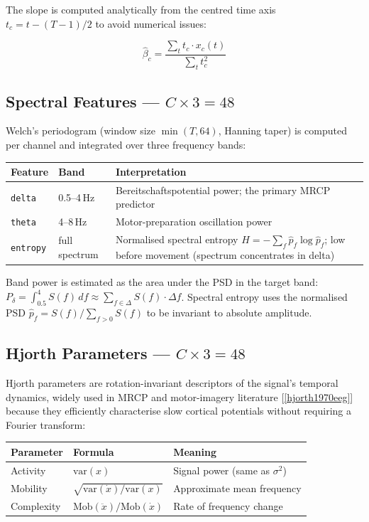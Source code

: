 \documentclass[12pt,a4paper]{article}
\begin{document}
The slope is computed analytically from the centred time axis
$t_c = t - (T-1)/2$ to avoid numerical issues:

\[
  \hat{\beta}_c = \frac{\sum_t t_c \cdot x_c(t)}{\sum_t t_c^2}
\]

\subsection{Spectral Features — $C \times 3 = 48$}

Welch's periodogram (window size $\min(T, 64)$, Hanning taper) is computed
per channel and integrated over three frequency bands:

\begin{center}
\begin{tabular}{llp{7.5cm}}
\toprule
Feature & Band & Interpretation \\
\midrule
\texttt{delta} & 0.5--4\,Hz & Bereitschaftspotential power; the primary MRCP predictor \\
\texttt{theta} & 4--8\,Hz & Motor-preparation oscillation power \\
\texttt{entropy} & full spectrum & Normalised spectral entropy $H = -\sum_f \hat{p}_f \log \hat{p}_f$; low before movement (spectrum concentrates in delta) \\
\bottomrule
\end{tabular}
\end{center}

Band power is estimated as the area under the PSD in the target band:
$P_\delta = \int_{0.5}^{4} S(f)\,df \approx \sum_{f \in \Delta} S(f) \cdot \Delta f$.
Spectral entropy uses the normalised PSD $\hat{p}_f = S(f) / \sum_{f>0} S(f)$
to be invariant to absolute amplitude.

\subsection{Hjorth Parameters — $C \times 3 = 48$}
\label{sec:hjorth}

Hjorth parameters are rotation-invariant descriptors of the signal's
temporal dynamics, widely used in MRCP and motor-imagery literature
[\ref{hjorth1970eeg}] because they efficiently characterise slow cortical
potentials without requiring a Fourier transform:

\begin{center}
\begin{tabular}{lll}
\toprule
Parameter & Formula & Meaning \\
\midrule
Activity & $\text{var}(x)$ & Signal power (same as $\sigma^2$) \\
Mobility & $\sqrt{\text{var}(\dot{x}) / \text{var}(x)}$ & Approximate mean frequency \\
Complexity & $\text{Mob}(\ddot{x}) / \text{Mob}(\dot{x})$ & Rate of frequency change \\
\bottomrule
\end{tabular}
\end{center}
\end{document}
